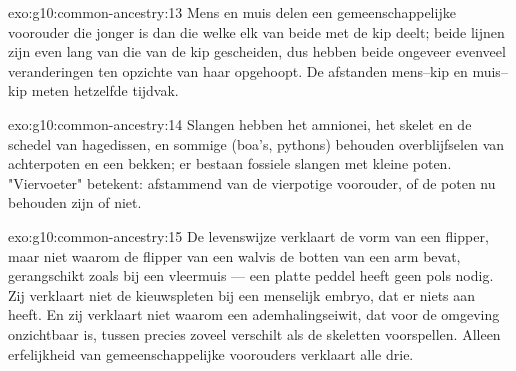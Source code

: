 \begin{solution}{exo:g10:common-ancestry:13}
Mens en muis delen een gemeenschappelijke voorouder die jonger is dan die
welke elk van beide met de kip deelt; beide lijnen zijn even lang van die
van de kip gescheiden, dus hebben beide ongeveer evenveel veranderingen
ten opzichte van haar opgehoopt. De afstanden mens--kip en muis--kip meten
hetzelfde tijdvak.
\end{solution}

\begin{solution}{exo:g10:common-ancestry:14}
Slangen hebben het amnionei, het skelet en de schedel van hagedissen, en
sommige (boa's, pythons) behouden overblijfselen van achterpoten en een
bekken; er bestaan fossiele slangen met kleine poten. "Viervoeter"
betekent: afstammend van de vierpotige voorouder, of de poten nu behouden
zijn of niet.
\end{solution}

\begin{solution}{exo:g10:common-ancestry:15}
De levenswijze verklaart de vorm van een flipper, maar niet waarom de
flipper van een walvis de botten van een arm bevat, gerangschikt zoals bij
een vleermuis --- een platte peddel heeft geen pols nodig. Zij verklaart
niet de kieuwspleten bij een menselijk embryo, dat er niets aan heeft. En
zij verklaart niet waarom een ademhalingseiwit, dat voor de omgeving
onzichtbaar is, tussen  precies zoveel verschilt als de skeletten
voorspellen. Alleen erfelijkheid van gemeenschappelijke voorouders
verklaart alle drie.
\end{solution}

